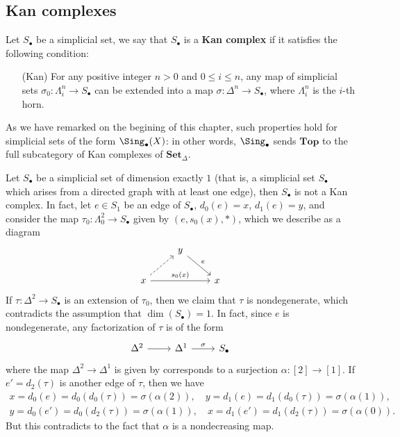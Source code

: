 \subsection{Kan complexes}
Let $S_\bullet$ be a simplicial set, we say that $S_\bullet$ is a \textbf{Kan complex} if it satisfies the following condition:
\begin{enumerate}[leftmargin=40pt]
\item[(Kan)] For any positive integer $n>0$ and $0\leq i\leq n$, any map of simplicial sets $\sigma_0:\Lambda^n_i\to S_\bullet$ can be extended into a map $\sigma:\Delta^n\to S_\bullet$, where $\Lambda^n_i$ is the $i$-th horn.
\end{enumerate}
As we have remarked on the begining of this chapter, such properties hold for simplicial sets of the form $\Sing_\bullet(X)$: in other words, $\Sing_\bullet$ sends $\mathbf{Top}$ to the full subcategory of Kan complexes of $\mathbf{Set}_\Delta$.
\begin{example}\label{simplicial set dim 1 not Kan}
Let $S_\bullet$ be a simplicial set of dimension exactly $1$ (that is, a simplicial set $S_\bullet$ which arises from a directed graph with at least one edge), then $S_\bullet$ is not a Kan complex. In fact, let $e\in S_1$ be an edge of $S_\bullet$, $d_0(e)=x$, $d_1(e)=y$, and consider the map $\tau_0:\Lambda^2_0\to S_\bullet$ given by $(e,s_0(x),\ast)$, which we describe as a diagram
\[\begin{tikzcd}
&y\ar[rd,"e"]&\\
x\ar[ru,dashed]\ar[rr,"s_0(x)"]&&x
\end{tikzcd}\]
If $\tau:\Delta^2\to S_\bullet$ is an extension of $\tau_0$, then we claim that $\tau$ is nondegenerate, which contradicts the assumption that $\dim(S_\bullet)=1$. In fact, since $e$ is nondegenerate, any factorization of $\tau$ is of the form
\[\begin{tikzcd}
\Delta^2\ar[r]&\Delta^1\ar[r,"\sigma"]&S_\bullet
\end{tikzcd}\]
where the map $\Delta^2\to\Delta^1$ is given by corresponds to a surjection $\alpha:[2]\to[1]$. If $e'=d_2(\tau)$ is another edge of $\tau$, then we have
\begin{gather*}
x=d_0(e)=d_0(d_0(\tau))=\sigma(\alpha(2)),\quad y=d_1(e)=d_1(d_0(\tau))=\sigma(\alpha(1)),\\
y=d_0(e')=d_0(d_2(\tau))=\sigma(\alpha(1)),\quad x=d_1(e')=d_1(d_2(\tau))=\sigma(\alpha(0)).
\end{gather*}
But this contradicts to the fact that $\alpha$ is a nondecreasing map.
\end{example}
